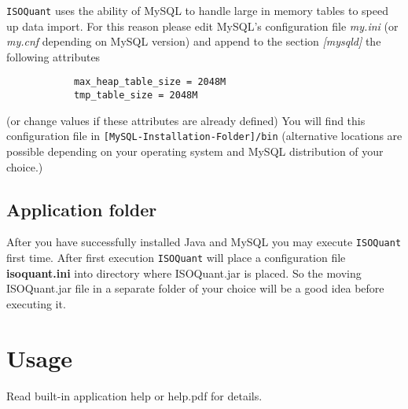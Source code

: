 \documentclass[a4paper,12pt]{scrartcl}
\newcommand{\iq}{\texttt{ISOQuant} }
\begin{document}
		\iq uses  the ability of MySQL to handle large in memory tables
		 to speed up data import. For this reason please 
		edit MySQL's configuration file \emph{my.ini} 
		(or \emph{my.cnf} depending on MySQL version)
		and append to the section \emph{[mysqld]} the following attributes
		\begin{lstlisting}
			max_heap_table_size = 2048M
			tmp_table_size = 2048M
		\end{lstlisting}
		(or change values if these attributes are already defined)
		You will find this configuration file in {\tt [MySQL-Installation-Folder]/bin}
		(alternative locations are possible depending on your 
		operating system and MySQL distribution of your choice.)

	\subsection{Application folder}
		After you have successfully installed Java and MySQL you may execute \iq first time.
		After first execution \iq will place a configuration file {\bf isoquant.ini} 
		into directory where ISOQuant.jar is placed.
		So the moving ISOQuant.jar file in a separate folder of your choice 
		will be a good idea before executing it.

\newpage
\section{Usage}
	Read built-in application help or help.pdf for details.
\end{document}
